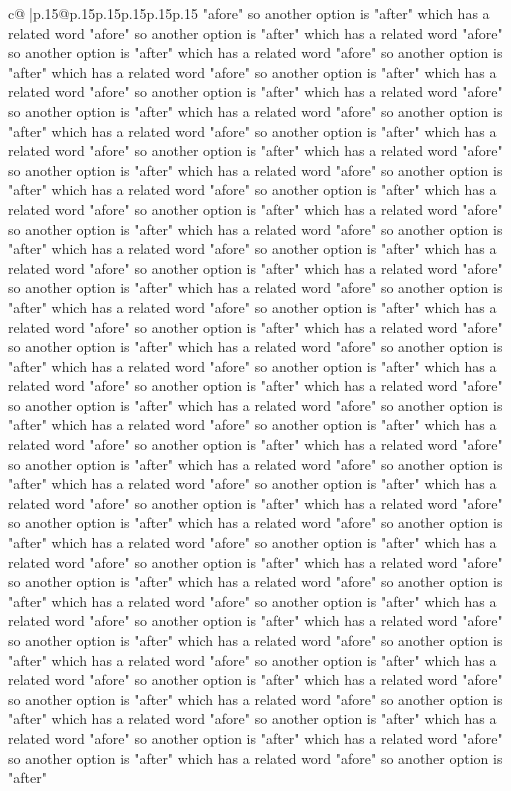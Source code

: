 \documentclass{article}
\begin{document}
{\begin{supertabular}{c@{$\;$}|p{.15\linewidth}@{}p{.15\linewidth}p{.15\linewidth}p{.15\linewidth}p{.15\linewidth}p{.15\linewidth}}
{{{"afore" so another option is "after" which has a related word "afore" so another option is "after" which has a related word "afore" so another option is "after" which has a related word "afore" so another option is "after" which has a related word "afore" so another option is "after" which has a related word "afore" so another option is "after" which has a related word "afore" so another option is "after" which has a related word "afore" so another option is "after" which has a related word "afore" so another option is "after" which has a related word "afore" so another option is "after" which has a related word "afore" so another option is "after" which has a related word "afore" so another option is "after" which has a related word "afore" so another option is "after" which has a related word "afore" so another option is "after" which has a related word "afore" so another option is "after" which has a related word "afore" so another option is "after" which has a related word "afore" so another option is "after" which has a related word "afore" so another option is "after" which has a related word "afore" so another option is "after" which has a related word "afore" so another option is "after" which has a related word "afore" so another option is "after" which has a related word "afore" so another option is "after" which has a related word "afore" so another option is "after" which has a related word "afore" so another option is "after" which has a related word "afore" so another option is "after" which has a related word "afore" so another option is "after" which has a related word "afore" so another option is "after" which has a related word "afore" so another option is "after" which has a related word "afore" so another option is "after" which has a related word "afore" so another option is "after" which has a related word "afore" so another option is "after" which has a related word "afore" so another option is "after" which has a related word "afore" so another option is "after" which has a related word "afore" so another option is "after" which has a related word "afore" so another option is "after" which has a related word "afore" so another option is "after" which has a related word "afore" so another option is "after" which has a related word "afore" so another option is "after" which has a related word "afore" so another option is "after" which has a related word "afore" so another option is "after" which has a related word "afore" so another option is "after" which has a related word "afore" so another option is "after" which has a related word "afore" so another option is "after" which has a related word "afore" so another option is "after" which has a related word "afore" so another option is "after" which has a related word "afore" so another option is "after" which has a related word "afore" so another option is "after" which has a related word "afore" so another option is "after" which has a related word "afore" so another option is "after" which has a related word "afore" so another option is "after" which has a related word "afore" so another option is "after" which has a related word "afore" so another option is "after" }}}
\end{supertabular}}
\end{document}
